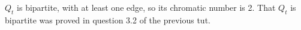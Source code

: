 $Q_t$ is bipartite, with at least one edge, so its chromatic number is 2.
That $Q_t$ is bipartite was proved in question 3.2 of the previous tut.
